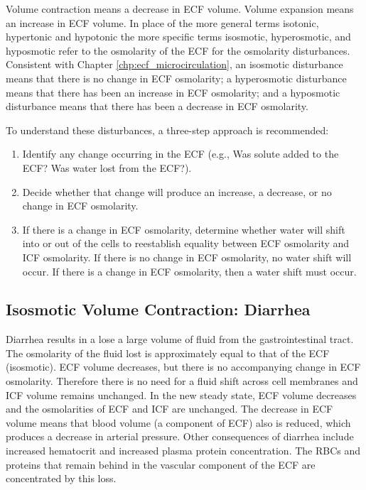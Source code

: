 Volume contraction means a decrease in ECF volume. Volume expansion means an increase in ECF volume. In place of the more general terms isotonic, hypertonic and hypotonic the more specific terms isosmotic, hyperosmotic, and hyposmotic refer to the osmolarity of the ECF for the osmolarity disturbances. Consistent with Chapter \ref{chp:ecf_microcirculation}, an isosmotic disturbance means that there is no change in ECF osmolarity; a hyperosmotic disturbance means that there has been an increase in ECF osmolarity; and a hyposmotic disturbance means that there has been a decrease in ECF osmolarity. 

To understand these disturbances, a three-step approach is recommended:

\begin{enumerate}
\item Identify any change occurring in the ECF (e.g., Was solute added to the ECF? Was water lost from the ECF?).
\item Decide whether that change will produce an increase, a decrease, or no change in ECF osmolarity. 
\item If there is a change in ECF osmolarity, determine whether water will shift into or out of the cells to reestablish equality between ECF osmolarity and ICF osmolarity. If there is no change in ECF osmolarity, no water shift will occur. If there is a change in ECF osmolarity, then a water shift must occur. 
\end{enumerate}

\subsection{Isosmotic Volume Contraction: Diarrhea}

Diarrhea results in a lose a large volume of fluid from the gastrointestinal tract. The osmolarity of the fluid lost is approximately equal to that of the ECF (isosmotic).  ECF volume decreases, but there is no accompanying change in ECF osmolarity. Therefore there is no need for a fluid shift across cell membranes and ICF volume remains unchanged. In the new steady state, ECF volume decreases and the osmolarities of ECF and ICF are unchanged. The decrease in ECF volume means that blood volume (a component of ECF) also is reduced, which produces a decrease in arterial pressure. Other consequences of diarrhea include increased hematocrit and increased plasma protein concentration. The RBCs and proteins that remain behind in the vascular component of the ECF are concentrated by this loss. 

